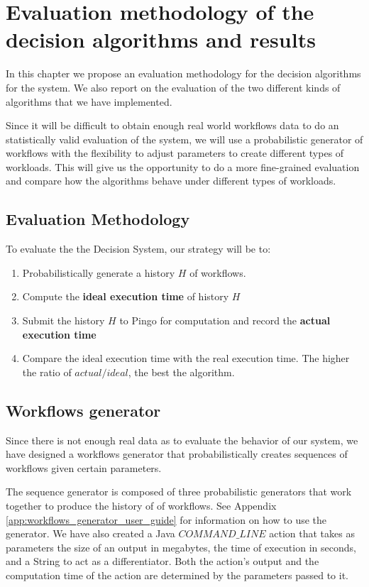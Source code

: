 \chapter{Evaluation methodology of the decision algorithms and results}
\label{chapter:evaluation}
In this chapter we propose an evaluation methodology for the decision algorithms for the system.  We also report on the evaluation of the two different kinds of algorithms that we have implemented.

Since it will be difficult to obtain enough real world workflows data to do an statistically valid evaluation of the system, we will use a probabilistic generator of workflows with the flexibility to adjust parameters to create different types of workloads.  This will give us the opportunity to do a more fine-grained evaluation and compare how the algorithms behave under different types of workloads.

\section{Evaluation Methodology}
To evaluate the the Decision System, our strategy will be to:
\begin{enumerate}
\item Probabilistically generate a history $H$ of workflows.
\item Compute the \textbf{ideal execution time} of history $H$
\item Submit the history $H$ to Pingo for computation and record the \textbf{actual execution time}
\item Compare the ideal execution time with the real execution time.  The higher the ratio of $actual/ideal$, the best the algorithm.
\end{enumerate}
\section{Workflows generator}
Since there is not enough real data as to evaluate the behavior of our system, we have designed a workflows generator that probabilistically creates sequences of workflows given certain parameters.

The sequence generator is composed of three probabilistic generators that work together to produce the history of of workflows.  See Appendix \ref{app:workflows_generator_user_guide} for information on how to use the generator.  We have also created a Java $COMMAND\_LINE$ action that takes as parameters the size of an output in megabytes, the time of execution in seconds, and a String to act as a differentiator.  Both the action's output and the computation time of the action are determined by the parameters passed to it.

